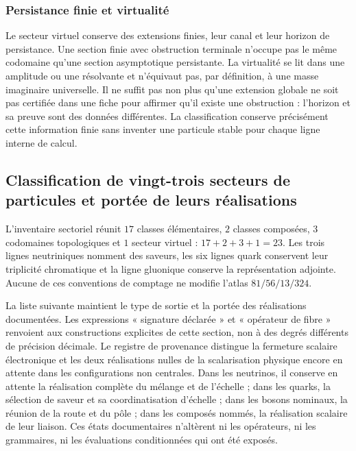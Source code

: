 \subsubsection{Persistance finie et virtualité
}

Le secteur virtuel conserve des extensions finies, leur canal et leur horizon
de persistance. Une section finie avec obstruction terminale n’occupe pas
le même codomaine qu’une section asymptotique persistante. La
virtualité se lit dans une amplitude ou une résolvante et n’équivaut pas, par
définition, à une masse imaginaire universelle. Il ne suffit pas non plus qu’une
extension globale ne soit pas certifiée dans une fiche pour affirmer qu’il
existe une obstruction : l’horizon et sa preuve sont des données différentes.
La classification conserve précisément cette information finie sans
inventer une particule stable pour chaque ligne interne de calcul.


\subsection{Classification de vingt-trois secteurs de particules et portée de leurs réalisations
}
\label{vi:subsec:23-clases}

L’inventaire sectoriel réunit \(17\) classes élémentaires, \(2\) classes
composées, \(3\) codomaines topologiques et \(1\) secteur virtuel :
\(17+2+3+1=23\). Les trois lignes neutriniques nomment des saveurs, les
six lignes quark conservent leur triplicité chromatique et la ligne gluonique
conserve la représentation adjointe. Aucune de ces conventions de
comptage ne modifie l’atlas \(81/56/13/324\).


La liste suivante maintient le type de sortie et la portée des
réalisations documentées. Les expressions « signature déclarée » et
« opérateur de fibre » renvoient aux constructions explicites de cette
section, non à des degrés différents de précision décimale.
Le registre de provenance distingue la fermeture scalaire électronique et
les deux réalisations nulles de la scalarisation physique encore en attente dans
les configurations non centrales. Dans les neutrinos, il conserve en attente la
réalisation complète du mélange et de l’échelle ; dans les quarks, la sélection de
saveur et sa coordinatisation d’échelle ; dans les bosons nominaux, la réunion de la route
et du pôle ; dans les composés nommés, la réalisation scalaire de leur
liaison. Ces états documentaires n’altèrent ni les opérateurs, ni les
grammaires, ni les évaluations conditionnées qui ont été exposés.


